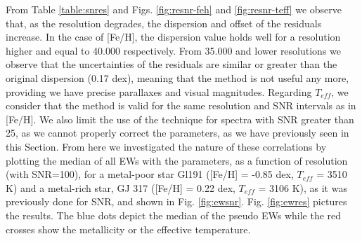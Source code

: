 \documentclass[referee]{aa}
\begin{document}
From Table \ref{table:snres} and Figs. \ref{fig:resnr-feh} and \ref{fig:resnr-teff} we observe that, as the resolution degrades, the dispersion and offset of the residuals increase. In the case of [Fe/H], the dispersion value holds well for a resolution higher and equal to 40.000 respectively. From 35.000 and lower resolutions we observe that the uncertainties of the residuals are similar or greater than the original dispersion (0.17 dex), meaning that the method is not useful any more, providing we have precise parallaxes and visual magnitudes. %
Regarding $T_{eff}$, we consider that the method is valid for the same resolution and SNR intervals as in [Fe/H]. We also limit the use of the technique for spectra with SNR greater than 25, as we cannot properly correct the parameters, as we have previously seen in this Section. %
From here we investigated the nature of these correlations by plotting the median of all EWs with the parameters, as a function of resolution (with SNR=100), for a metal-poor star Gl191 ([Fe/H] = -0.85 dex, $T_{eff}$ = 3510 K) and a metal-rich star, GJ 317 ([Fe/H] = 0.22 dex, $T_{eff}$ = 3106 K), as it was previously done for SNR, and shown in Fig. \ref{fig:ewsnr}. Fig. \ref{fig:ewres} pictures the results. The blue dots depict the median of the pseudo EWs while the red crosses show the metallicity or the effective temperature.
\end{document}
